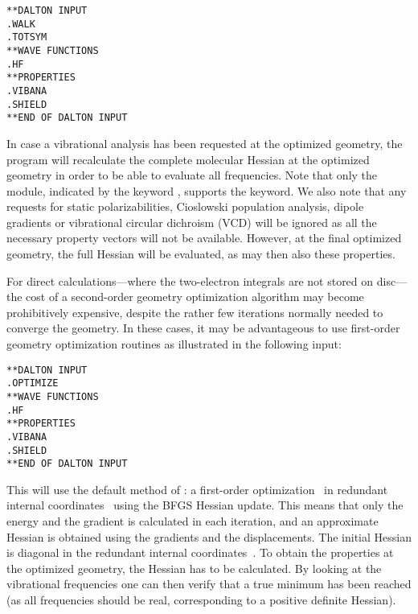 \begin{verbatim}
**DALTON INPUT
.WALK
.TOTSYM
**WAVE FUNCTIONS
.HF
**PROPERTIES
.VIBANA
.SHIELD
**END OF DALTON INPUT
\end{verbatim}

In case a vibrational analysis has been requested at the optimized
geometry, the program will recalculate the complete molecular Hessian
at the optimized geometry in order to be able to evaluate all
frequencies. Note that only the  module, indicated by the
keyword , supports the  keyword.
We also note that any requests for static
polarizabilities, Cioslowski population
analysis, dipole 
gradients or vibrational circular dichroism
(VCD) will be ignored
as all the necessary property vectors will not be available. However,
at the final optimized geometry, the full Hessian will be evaluated,
as may then also these properties.

For direct calculations---where the
two-electron integrals are not stored on disc---the cost of a
second-order geometry optimization algorithm may become
prohibitively expensive, despite the rather few iterations normally
needed to converge the geometry. In these cases, it may be
advantageous to use first-order geometry
optimization routines as illustrated in the following input:

\begin{verbatim}
**DALTON INPUT
.OPTIMIZE
**WAVE FUNCTIONS
.HF
**PROPERTIES
.VIBANA
.SHIELD
**END OF DALTON INPUT
\end{verbatim}

This will use the default method of : a first-order
optimization~\cite{Fletcher} in redundant internal
coordinates~\cite{gfxfzpwtppjacs114,ppgfjcp96,vbthjcp117}
using the BFGS
Hessian update. This means that
only the energy and the gradient is calculated in each iteration, and
an approximate Hessian is obtained using the gradients and the
displacements. The initial Hessian is diagonal in the redundant
internal coordinates~\cite{rlabgkpamcpl241}.
To obtain the properties at the optimized 
geometry, the Hessian has to be calculated. By looking at the
vibrational frequencies one can then verify that a true minimum has
been reached (as all frequencies should be real, corresponding to a
positive definite Hessian).

